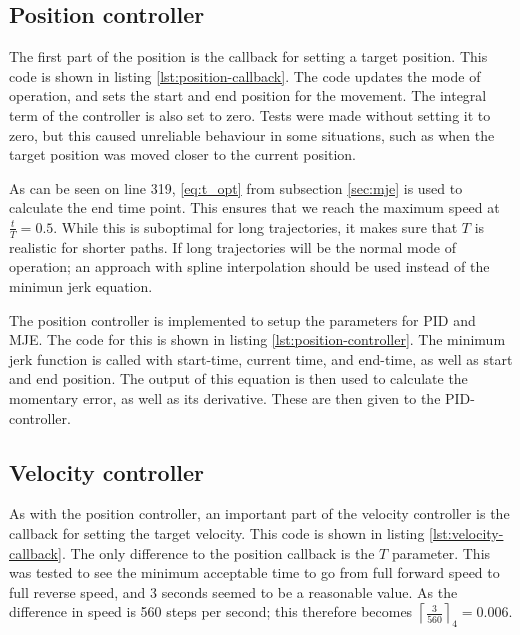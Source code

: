 \documentclass[11pt]{article}
\begin{document}
\subsection{Position controller}
The first part of the position is the callback for setting a target position. This code is shown in listing \vref{lst:position-callback}. The code updates the mode of operation, and sets the start and end position for the movement. The integral term of the controller is also set to zero. Tests were made without setting it to zero, but this caused unreliable behaviour in some situations, such as when the target position was moved closer to the current position. \par

As can be seen on line 319, \ref{eq:t_opt} from subsection \vref{sec:mje} is used to calculate the end time point. This ensures that we  reach the maximum speed at $\frac{t}{T} = 0.5$. While this is suboptimal for long trajectories, it makes sure that $T$ is realistic for shorter paths. If long trajectories will be the normal mode of operation; an approach with spline interpolation should be used instead of the minimun jerk equation. \par
\newpage


The position controller is implemented to setup the parameters for PID and MJE. The code for this is shown in listing \vref{lst:position-controller}. The minimum jerk function is called with start-time, current time, and end-time, as well as start and end position. The output of this equation is then used to calculate the momentary error, as well as its derivative. These are then given to the PID-controller. \par



\subsection{Velocity controller}
As with the position controller, an important part of the velocity controller is the callback for setting the target velocity. This code is shown in listing \vref{lst:velocity-callback}. The only difference to the position callback is the $T$ parameter. This was tested to see the minimum acceptable time to go from full forward speed to full reverse speed, and 3 seconds seemed to be a reasonable value. As the difference in speed is 560 steps per second; this therefore becomes $\left\lceil\frac{3}{560}\right\rceil _4 = 0.006$. \par
\end{document}
